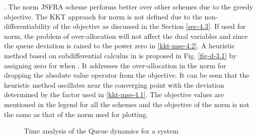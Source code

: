 . The  norm \ac{JSFRA} scheme performs better over other schemes due to the greedy objective. The \ac{KKT} approach for  norm is not defined due to the non-differentiability of the objective as discussed in the Section \ref{sec-4.3}. If used for  norm, the problem of over-allocation will not affect the dual variables  and  since the queue deviation is raised to the power zero in \eqref{kkt-mse-4.2}. A heuristic method based on subdifferential calculus in \cite{bertsekas1999nonlinear} is proposed in Fig. \ref{fig-d-3.1} by assigning zero for  when . It addresses the over-allocation in the  norm for dropping the absolute value operator from the objective. It can be seen that the heuristic method oscillates near the converging point with the deviation determined by the factor \me{\rho} used in \eqref{kkt-mse-4.1}. The objective values are mentioned in the legend for all the schemes and the objective of the  norm is not the same as that of the  norm used for plotting.
\begin{figure*}
	\centering
	\hfill
	\caption{Time analysis of the Queue dynamics for a system }
	\label{fig-time-analysis}
\end{figure*}

